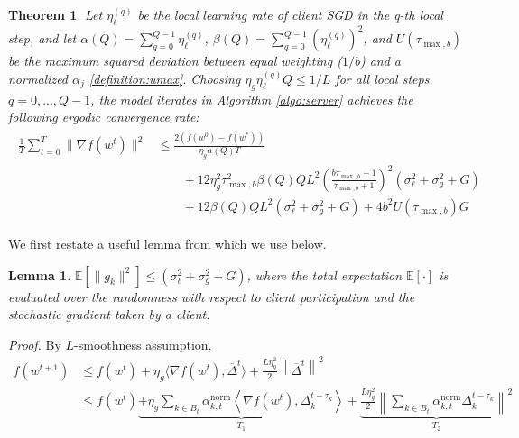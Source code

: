 \documentclass{article}
\newtheorem{theorem}{Theorem} %
\newtheorem{lemma}{Lemma}     %
\begin{document}
\begin{theorem}
    Let $\eta_{\ell}^{(q)}$ be the local learning rate of client SGD in the q-th local step, and let $\alpha(Q) = \sum_{q=0}^{Q-1}{\eta_\ell^{(q)}}$, $\beta(Q) = \sum_{q=0}^{Q-1}{(\eta_\ell^{(q)})^2}$, and $U(\tau_{\max, b})$ be the maximum squared deviation between equal weighting ($1/b$) and a normalized $\alpha_j$ \ref{definition:umax}. Choosing $\eta_g \eta_\ell^{(q)} Q \leq 1/L$ for all local steps $q= 0, ..., Q-1$, the model iterates in Algorithm \ref{algo:server} achieves the following ergodic convergence rate:
    \begin{align}
    \begin{split}
        \frac{1}{T}\sum_{t=0}^{T}{ \| \nabla f(w^t) \|^2}
    &\leq
    \frac{2 (f(w^0) - f(w^*))}{\eta_g \alpha(Q) T}
    \\
    &\qquad + 
    12 \eta_g^2 \tau_{\max, b}^2  \beta(Q) Q  L^2 
    \left( \frac{b\tau_{\max, b} + 1}{\tau_{\max, b} + 1}\right)^2
    \left(\sigma_\ell^2 + \sigma^2_g + G \right)
    \\
    &\qquad +
    12 \beta(Q)  Q L^2 ( \sigma_\ell^2 + \sigma_g^2 + G) 
    +
    4 b^2 U(\tau_{\max, b})G
    \end{split}
    \end{align}
\end{theorem}

We first restate a useful lemma from \cite{nguyen2022federated} which we use below.

\begin{lemma}
    $\mathbb{E}\left[\|g_k\|^2\right] \leq (\sigma_\ell^2 + \sigma^2_g + G)$, where the total expectation $\mathbb{E}[\cdot]$ is evaluated over the randomness with respect to client participation and the stochastic gradient taken by a client.
    \label{lemma:grad-norm-bound}
\end{lemma}

\emph{Proof.} By $L$-smoothness assumption,
\begin{align*}
    f(w^{t+1}) &\leq 
    f(w^{t}) + \eta_g \langle \nabla f(w^t), \overline{\Delta}^t \rangle + \frac{L \eta_g^2}{2} \left\|
        \overline{\Delta}^t 
    \right\|^2 \\
    &\leq f(w^{t}) 
    \underbrace{
        + \eta_g \sum_{k \in B_t}{\alpha^{\text{norm}}_{k, t} \left\langle 
            \nabla f(w^t), \Delta_k^{t-\tau_k}
        \right\rangle}
    }_{T_1} + 
    \underbrace{
        \frac{L \eta^2_g}{2} \left\| \sum_{k \in B_t}{\alpha^{\text{norm}}_{k, t} \Delta_k^{t - \tau_k}}\right\|^2
    }_{T_2}
\end{align*}
\end{document}
